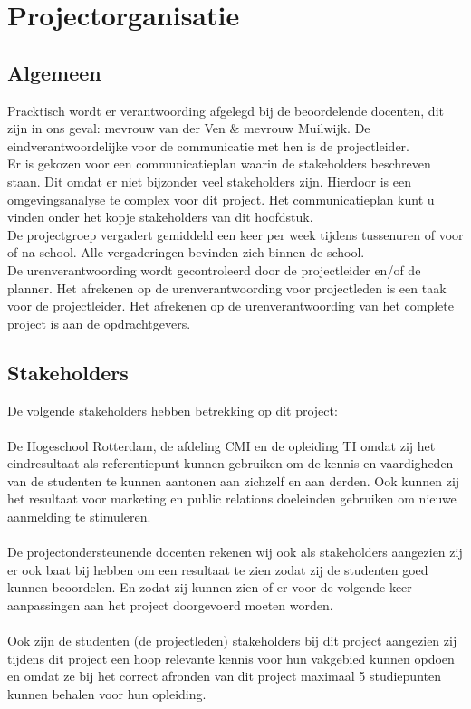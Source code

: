 \documentclass[oneside]{book}
\begin{document}
\chapter{Projectorganisatie}
\section*{Algemeen}
Pracktisch wordt er verantwoording afgelegd bij de beoordelende docenten, dit zijn in ons geval: mevrouw van der Ven \& mevrouw Muilwijk.
De eindverantwoordelijke voor de communicatie met hen is de projectleider.\\
Er is gekozen voor een communicatieplan waarin de stakeholders beschreven staan.
Dit omdat er niet bijzonder veel stakeholders zijn.
Hierdoor is een omgevingsanalyse te complex voor dit project.
Het communicatieplan kunt u vinden onder het kopje stakeholders van dit hoofdstuk.\\
De projectgroep vergadert gemiddeld een keer per week tijdens tussenuren of voor of na school.
Alle vergaderingen bevinden zich binnen de school.\\
De urenverantwoording wordt gecontroleerd door de projectleider en/of de planner.
Het afrekenen op de urenverantwoording voor projectleden is een taak voor de projectleider.
Het afrekenen op de urenverantwoording van het complete project is aan de opdrachtgevers.
\section*{Stakeholders}
De volgende stakeholders hebben betrekking op dit project:\\
\\
De Hogeschool Rotterdam, de afdeling CMI en de opleiding TI omdat zij het eindresultaat als
referentiepunt kunnen gebruiken om de kennis en vaardigheden van de studenten te kunnen
aantonen aan zichzelf en aan derden.
Ook kunnen zij het resultaat voor marketing en public relations doeleinden gebruiken om nieuwe
aanmelding te stimuleren.\\
\\
De projectondersteunende docenten rekenen wij ook als stakeholders aangezien zij er ook baat bij hebben om een resultaat te zien zodat zij de studenten goed kunnen beoordelen.
En zodat zij kunnen zien of er voor de volgende keer aanpassingen aan het project doorgevoerd
moeten worden.\\
\\
Ook zijn de studenten (de projectleden) stakeholders bij dit project aangezien zij tijdens dit project
een hoop relevante kennis voor hun vakgebied kunnen opdoen en omdat ze bij het correct afronden
van dit project maximaal 5 studiepunten kunnen behalen voor hun opleiding.
\clearpage
\end{document}
